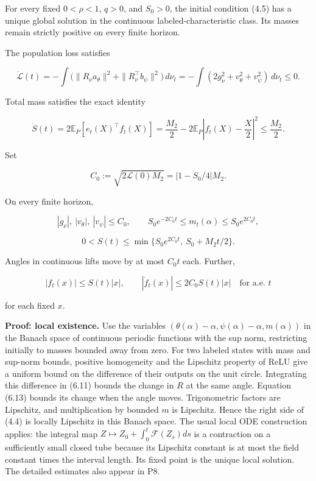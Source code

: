 \documentclass[
  10pt,
]{article}
\begin{document}
For every fixed \(0<\rho<1\), \(q>0\), and \(S_0>0\), the initial
condition (4.5) has a unique global solution in the continuous
labeled-characteristic class. Its masses remain strictly positive on
every finite horizon.

The population loss satisfies

\[
 \dot{\mathcal L}(t)
 =-\int\bigl(\|R_\nu a_\theta\|^2+
                  \|R_\nu^\top b_\psi\|^2\bigr)\,d\nu_t
 =-\int(2g_\nu^2+v_\theta^2+v_\psi^2)\,d\nu_t\le0.
 \tag{7.1}
\]

Total mass satisfies the exact identity

\[
 \boxed{
 \dot S(t)=2\mathbb E_P[e_t(X)^\top f_t(X)]
 =\frac{M_2}{2}-2\mathbb E_P\left|f_t(X)-\frac X2\right|^2
 \le\frac{M_2}{2}.}
 \tag{7.2}
\]

Set

\[
 C_0:=\sqrt{2\mathcal L(0)M_2}=|1-S_0/4|M_2.
 \tag{7.3}
\]

On every finite horizon,

\[
 |g_\nu|,\ |v_\theta|,\ |v_\psi|\le C_0,
 \qquad
 S_0e^{-2C_0t}\le m_t(\alpha)\le S_0e^{2C_0t},
 \tag{7.4}
\]

\[
 0<S(t)\le\min\{S_0e^{2C_0t},\ S_0+M_2t/2\}.
 \tag{7.5}
\]

Angles in continuous lifts move by at most \(C_0t\) each. Further,

\[
 |f_t(x)|\le S(t)|x|,\qquad
 |\dot f_t(x)|\le2C_0S(t)|x|\quad\text{for a.e. }t
 \tag{7.6}
\]

for each fixed \(x\).

\textbf{Proof: local existence.} Use the variables
\((\theta(\alpha)-\alpha,\psi(\alpha)-\alpha,m(\alpha))\) in the Banach
space of continuous periodic functions with the sup norm, restricting
initially to masses bounded away from zero. For two labeled states with
mass and sup-norm bounds, positive homogeneity and the Lipschitz
property of ReLU give a uniform bound on the difference of their outputs
on the unit circle. Integrating this difference in (6.11) bounds the
change in \(R\) at the same angle. Equation (6.13) bounds its change
when the angle moves. Trigonometric factors are Lipschitz, and
multiplication by bounded \(m\) is Lipschitz. Hence the right side of
(4.4) is locally Lipschitz in this Banach space. The usual local ODE
construction applies: the integral map
\(Z\mapsto Z_0+\int_0^t\mathscr F(Z_s)ds\) is a contraction on a
sufficiently small closed tube because its Lipschitz constant is at most
the field constant times the interval length. Its fixed point is the
unique local solution. The detailed estimates also appear in P8.
\end{document}
